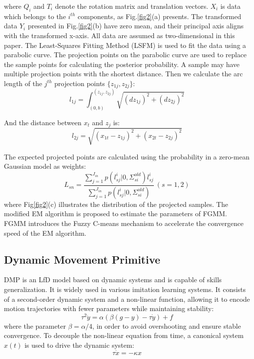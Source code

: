 \documentclass[conference]{IEEEtran}
\begin{document}
where $Q_i$ and $T_i$ denote the rotation matrix and translation vectors. $X_i$ is data which belongs to the $i^{th}$ components, as Fig.\ref{fig2}(a) presents. The transformed data $Y_i$ presented in Fig.\ref{fig2}(b) have zero mean, and their principal axis aligns with the transformed x-axis. All data are assumed as two-dimensional in this paper. The Least-Squares Fitting Method (LSFM) is used to fit the data using a parabolic curve. The projection points on the parabolic curve are used to replace the sample points for calculating the posterior probability. A sample may have multiple projection points with the shortest distance. Then we calculate the arc length of the $j^{th}$ projection points $\{z_{1j},z_{2j}\}$:
\begin{equation}
    l_{1j}=\int_{(0,b)}^{(z_{1j},z_{2j})}\sqrt{(dz_{1j})^2+(dz_{2j})^2}
\end{equation}

And the distance between $x_t$ and $z_j$ is:
\begin{equation}
    l_{2j}=\sqrt{(x_{1t}-z_{1j})^2+(x_{2t}-z_{2j})^2}
\end{equation}

The expected projected points are calculated using the probability in a zero-mean Gaussian model as weights:
\begin{equation}    L_{sn}=\frac{\sum^{J_{in}}_{j=1}p(l^i_{sj}|0,\Sigma^{old}_{si})l^i_{sj}}{\sum^{J_{in}}_{j=1}p(l^i_{sj}|0,\Sigma^{old}_{si})}~(s=1,2)
\end{equation}
where Fig\ref{fig2}(c) illustrates the distribution of the projected samples. The modified EM algorithm is proposed to estimate the parameters of FGMM. FGMM introduces the Fuzzy C-means mechanism to accelerate the convergence speed of the EM algorithm.

\subsection{Dynamic Movement Primitive}
DMP is an LfD model based on dynamic systems and is capable of skills generalization\cite{Ijspeert2013}. It is widely used in various imitation learning systems\cite{Zhang2020, Luo2023}. It consists of a second-order dynamic system and a non-linear function, allowing it to encode motion trajectories with fewer parameters while maintaining stability:
\begin{equation}
    \tau^2 \ddot y = \alpha(\beta(g-y)-\tau \dot y) + f
    \label{eq4}
\end{equation}
where the parameter $\beta = \alpha / 4$, in order to avoid overshooting and ensure stable convergence. To decouple the non-linear equation from time, a canonical system $x(t)$ is used to drive the dynamic system:
\begin{equation}
    \tau \dot x = - \kappa x
\end{equation}
\end{document}
